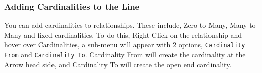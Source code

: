 \documentclass[a4paper]{article}
\begin{document}
{\subsubsection{Adding Cardinalities to the Line}
You can add cardinalities to relationships. These include, Zero-to-Many, Many-to-Many and fixed cardinalities. To do this, Right-Click on the relationship and hover over Cardinalities, a sub-menu will appear with 2 options, \texttt{Cardinality From} and \texttt{Cardinality To}. Cardinality From will create the cardinality at the Arrow head side, and Cardinality To will create the open end cardinality. 

\begin{figure}[H]
\begin{center}
 \imagespace
{}

\end{center}
\end{figure}}
\end{document}
